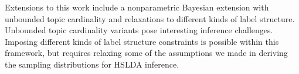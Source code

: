 

Extensions to this work include a nonparametric Bayesian extension
with unbounded topic cardinality and relaxations to different kinds of
label structure. Unbounded topic cardinality variants pose interesting
inference challenges. Imposing different kinds of label structure
constraints is possible within this framework, but requires relaxing
some of the assumptions we made in deriving the sampling distributions
for HSLDA inference.


